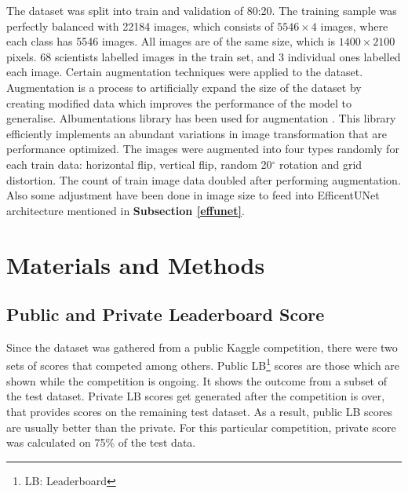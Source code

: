 \documentclass[conference]{IEEEtran}
\begin{document}
The dataset was split into train and validation of 80:20. The training sample was perfectly balanced with 22184 images, which consists of $5546\times4$ images, where each class has 5546 images. All images are of the same size, which is $1400\times2100$ pixels. 68 scientists labelled images in the train set, and 3 individual ones labelled each image. Certain augmentation techniques were applied to the dataset. Augmentation is a process to artificially expand the size of the dataset by creating modified data which improves the performance of the model to generalise. Albumentations library has been used for augmentation \cite{buslaev2020albumentations}. This library efficiently implements an abundant variations in image transformation that are performance optimized. The images were augmented into four types randomly for each train data: horizontal flip, vertical flip, random 20$^\circ$ rotation and grid distortion. The count of train image data doubled after performing augmentation. Also some adjustment have been done in image size to feed into EfficentUNet architecture mentioned in \textbf{Subsection \ref{effunet}}. 
















\section{Materials and Methods \label{evaluation}}



\subsection{Public and Private Leaderboard Score}
Since the dataset was gathered from a public Kaggle competition, there were two sets of scores that competed among others. Public LB\footnote{LB: Leaderboard} scores are those which are shown while the competition is ongoing. It shows the outcome from a subset of the test dataset. Private LB scores get generated after the competition is over, that provides scores on the remaining test dataset. As a result, public LB scores are usually better than the private. For this particular competition, private score was calculated on 75\% of the test data. 
\end{document}
